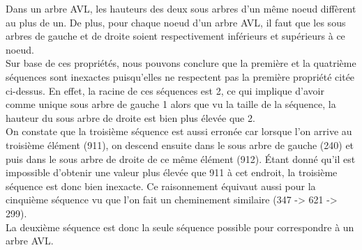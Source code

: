 \documentclass[10pt,a4paper]{article}
\begin{document}
Dans un arbre AVL, les hauteurs des deux sous arbres d'un même noeud diffèrent au plus de un. De plus, pour chaque noeud d'un arbre AVL, il faut que les sous arbres de gauche et de droite soient respectivement inférieurs et supérieurs à ce noeud. \\
Sur base de ces propriétés, nous pouvons conclure que la première et la quatrième séquences sont inexactes puisqu'elles ne respectent pas la première propriété citée ci-dessus. En effet, la racine de ces séquences est 2, ce qui implique d'avoir comme unique sous arbre de gauche 1 alors que vu la taille de la séquence, la hauteur du sous arbre de droite est bien plus élevée que 2.\\
On constate que la troisième séquence est aussi erronée car lorsque l'on arrive au troisième élément (911), on descend ensuite dans le sous arbre de gauche (240) et puis dans le sous arbre de droite de ce même élément (912). Étant donné qu'il est impossible d'obtenir une valeur plus élevée que 911 à cet endroit, la troisième séquence est donc bien inexacte. Ce raisonnement équivaut aussi pour la cinquième séquence vu que l'on fait un cheminement similaire (347 -> 621 -> 299).\\
La deuxième séquence est donc la seule séquence possible pour correspondre à un arbre AVL.
\end{document}
